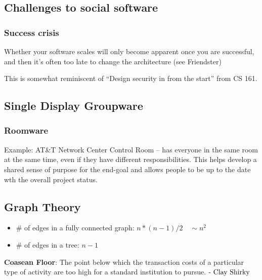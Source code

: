 \subsection{Challenges to social software}
\subsubsection{Success crisis}
\begin{shaded}
    Whether your software scales will only become apparent once you are successful, and then it’s often too late to change the architecture (see Friendster)
\end{shaded}
This is somewhat reminiscent of ``Design security in from the start'' from CS 161.

\subsection{Single Display Groupware}
\subsubsection{Roomware}
Example: AT\&T Network Center Control Room -- has everyone in the same room at the same time, even if they have different responsibilities. This helps develop a shared sense of purpose for the end-goal and allows people to be up to the date wth the overall project status.

\subsection{Graph Theory}
\begin{itemize}
    \item  \# of edges in a fully connected graph: $n*(n-1)/2 \quad\sim n^2$
    \item \# of edges in a tree: $n-1$
\end{itemize}

\begin{shaded}
    \textbf{Coasean Floor}: The point below which the transaction costs of a particular type of activity are too high for a standard institution to pursue.
    $\hfill\text{- Clay Shirky}$
\end{shaded}

